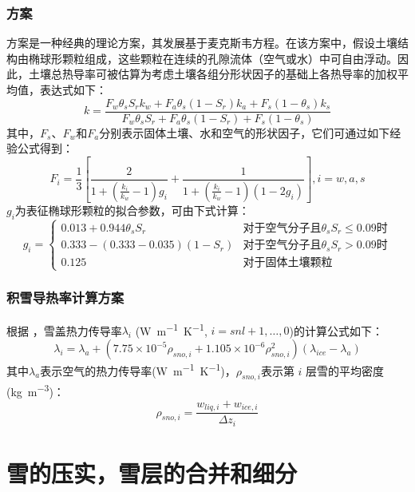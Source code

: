 \subsubsection{\citet{de1963thermal}方案}
\citet{de1963thermal}方案是一种经典的理论方案，其发展基于麦克斯韦方程。在该方案中，假设土壤结构由椭球形颗粒组成，这些颗粒在连续的孔隙流体（空气或水）中可自由浮动。因此，土壤总热导率可被估算为考虑土壤各组分形状因子的基础上各热导率的加权平均值，表达式如下：$$k=\frac{F_w\theta_sS_rk_w+F_a\theta_s\left(1-S_r\right)k_a+F_s\left(1-\theta_s\right)k_s}{F_w\theta_sS_r+F_a\theta_s\left(1-S_r\right)+F_s\left(1-\theta_s\right)}$$
其中，$F_s$、$F_w$和$F_a$分别表示固体土壤、水和空气的形状因子，它们可通过如下经验公式得到：
\begin{equation}
F_i=\frac{1}{3}\left[\frac{2}{1+\left(\frac{k_i}{k_w}-1\right)g_i}+\frac{1}{1+\left(\frac{k_i}{k_w}-1\right)(1-2g_i)}\right], i=w,a,s
\end{equation}
$g_i$为表征椭球形颗粒的拟合参数，可由下式计算：
\begin{equation}
g_i=\begin{cases}
0.013+0.944\theta_sS_r  & \text{对于空气分子且}\theta_sS_r\leq 0.09 \text{时} \\ 
0.333-\left(0.333-0.035\right)\left(1-S_r\right) & \text{对于空气分子且}\theta_sS_r>0.09\text{时} \\
0.125 &\text{对于固体土壤颗粒}
\end{cases}
\end{equation}

\subsubsection{积雪导热率计算方案}
根据 \citet{jordan1991one}，雪盖热力传导率$\lambda_i$ (\unit{W.m^{-1}.K^{-1}}, $i=snl+1,\ldots,0$)的计算公式如下：
\begin{equation}
\lambda_{i}=\lambda_{a}+\left(7.75 \times 10^{-5} \rho_{sno, i}+1.105 \times 10^{-6} \rho_{sno, i}^{2}\right)\left(\lambda_{ice}-\lambda_{a}\right)
\end{equation}
其中$\lambda_a$表示空气的热力传导率(\unit{W.m^{-1}.K^{-1}})，$\rho_{sno,i}$表示第 $i$ 层雪的平均密度(\unit{kg.m^{-3}})：
\begin{equation}
\rho_{sno, i}=\frac{w_{liq, i}+w_{ice, i}}{\Delta z_{i}}
\end{equation}

\section{雪的压实，雪层的合并和细分}
